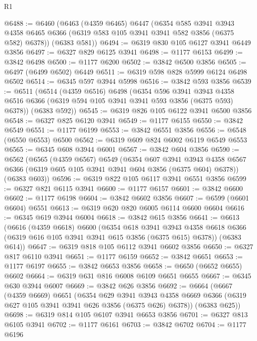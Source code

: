 \begin{lexlean}{R1}
\begin{coremodule}
@6488 := @6460
    (@6463
      (@4359 @6465)
      @6447
      (@6354
        @585
        @3941
        @3943
        @4358
        @6465
        @6366
        (@6319 @583 @105 @3941 @3941 @582 @3856 (@6375 @582) @6378))
      (@6383 @581))
@6494 := @6319 @830 @105 @6127 @3941 @6449 @3856
@6497 := @6327 @829 @6125 @3941
@6498 := @1177 @6153
@6499 := @3842 @6498
@6500 := @1177 @6200
@6502 := @3842 @6500 @3856
@6505 := @6497 (@6499 @6502) @6449
@6511 := @6319 @598 @828 @5999 @6124 @6498 @6502
@6514 := @6345 @597 @3944 @5998
@6516 := @3842 @593 @3856
@6539 := @6511
    (@6514
      (@4359 @6516)
      @6498
      (@6354
        @596
        @3941
        @3943
        @4358
        @6516
        @6366
        (@6319 @594 @105 @3941 @3941 @593 @3856 (@6375 @593) @6378))
      (@6383 @592))
@6545 := @6319 @826 @105 @6122 @3941 @6500 @3856
@6548 := @6327 @825 @6120 @3941
@6549 := @1177 @6155
@6550 := @3842 @6549
@6551 := @1177 @6199
@6553 := @3842 @6551 @3856
@6556 := @6548 (@6550 @6553) @6500
@6562 := @6319 @609 @824 @6002 @6119 @6549 @6553
@6565 := @6345 @608 @3944 @6001
@6567 := @3842 @604 @3856
@6590 := @6562
    (@6565
      (@4359 @6567)
      @6549
      (@6354
        @607
        @3941
        @3943
        @4358
        @6567
        @6366
        (@6319 @605 @105 @3941 @3941 @604 @3856 (@6375 @604) @6378))
      (@6383 @603))
@6596 := @6319 @822 @105 @6117 @3941 @6551 @3856
@6599 := @6327 @821 @6115 @3941
@6600 := @1177 @6157
@6601 := @3842 @6600
@6602 := @1177 @6198
@6604 := @3842 @6602 @3856
@6607 := @6599 (@6601 @6604) @6551
@6613 := @6319 @620 @820 @6005 @6114 @6600 @6604
@6616 := @6345 @619 @3944 @6004
@6618 := @3842 @615 @3856
@6641 := @6613
    (@6616
      (@4359 @6618)
      @6600
      (@6354
        @618
        @3941
        @3943
        @4358
        @6618
        @6366
        (@6319 @616 @105 @3941 @3941 @615 @3856 (@6375 @615) @6378))
      (@6383 @614))
@6647 := @6319 @818 @105 @6112 @3941 @6602 @3856
@6650 := @6327 @817 @6110 @3941
@6651 := @1177 @6159
@6652 := @3842 @6651
@6653 := @1177 @6197
@6655 := @3842 @6653 @3856
@6658 := @6650 (@6652 @6655) @6602
@6664 := @6319 @631 @816 @6008 @6109 @6651 @6655
@6667 := @6345 @630 @3944 @6007
@6669 := @3842 @626 @3856
@6692 := @6664
    (@6667
      (@4359 @6669)
      @6651
      (@6354
        @629
        @3941
        @3943
        @4358
        @6669
        @6366
        (@6319 @627 @105 @3941 @3941 @626 @3856 (@6375 @626) @6378))
      (@6383 @625))
@6698 := @6319 @814 @105 @6107 @3941 @6653 @3856
@6701 := @6327 @813 @6105 @3941
@6702 := @1177 @6161
@6703 := @3842 @6702
@6704 := @1177 @6196

\end{coremodule}
\end{lexlean}
